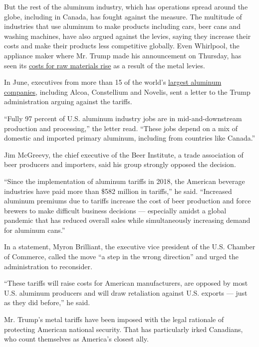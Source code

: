 But the rest of the aluminum industry, which has operations spread
around the globe, including in Canada, has fought against the measure.
The multitude of industries that use aluminum to make products including
cars, beer cans and washing machines, have also argued against the
levies, saying they increase their costs and make their products less
competitive globally. Even Whirlpool, the appliance maker where Mr.
Trump made his announcement on Thursday, has seen its
\href{https://www.wsj.com/articles/whirlpool-wanted-washing-machine-tariffs-it-didnt-plan-for-a-trade-war-1531757621}{costs
for raw materials rise} as a result of the metal levies.

In June, executives from more than 15 of the world's
\href{https://www.nytimes3xbfgragh.onion/2020/06/23/business/economy/usmca-canada-aluminum-tariffs.html}{largest
aluminum companies}, including Alcoa, Constellium and Novelis, sent a
letter to the Trump administration arguing against the tariffs.

``Fully 97 percent of U.S. aluminum industry jobs are in
mid-and-downstream production and processing,'' the letter read. ``These
jobs depend on a mix of domestic and imported primary aluminum,
including from countries like Canada.''

Jim McGreevy, the chief executive of the Beer Institute, a trade
association of beer producers and importers, said his group strongly
opposed the decision.

``Since the implementation of aluminum tariffs in 2018, the American
beverage industries have paid more than \$582 million in tariffs,'' he
said. ``Increased aluminum premiums due to tariffs increase the cost of
beer production and force brewers to make difficult business decisions
--- especially amidst a global pandemic that has reduced overall sales
while simultaneously increasing demand for aluminum cans.''

In a statement, Myron Brilliant, the executive vice president of the
U.S. Chamber of Commerce, called the move ``a step in the wrong
direction'' and urged the administration to reconsider.

``These tariffs will raise costs for American manufacturers, are opposed
by most U.S. aluminum producers and will draw retaliation against U.S.
exports --- just as they did before,'' he said.

Mr. Trump's metal tariffs have been imposed with the legal rationale of
protecting American national security. That has particularly irked
Canadians, who count themselves as America's closest ally.

